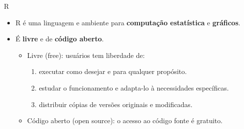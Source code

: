 \documentclass[
  ignorenonframetext,
  serif,
  professionalfont,
  usenames,
  dvipsnames,
  aspectratio = 169]{beamer}
\providecommand{\tightlist}{%
  \setlength{\itemsep}{0pt}\setlength{\parskip}{0pt}}
\renewcommand{\tightlist}{%
  \setlength{\itemsep}{0\baselineskip}
  \setlength{\parskip}{0.25\baselineskip}
}
\begin{document}
\begin{frame}{R}
\label{r}
\begin{itemize}
\tightlist
\item
  R é uma linguagem e ambiente para \textbf{computação estatística} e
  \textbf{gráficos}.
\end{itemize}

\vspace{0.3cm}

\begin{itemize}
\tightlist
\item
  É \textbf{livre} e de \textbf{código aberto}.

  \begin{itemize}
  \tightlist
  \item
    Livre (free): usuários tem liberdade de:

    \begin{enumerate}
    \tightlist
    \item
      executar como desejar e para qualquer propósito.
    \item
      estudar o funcionamento e adapta-lo à necessidades específicas.
    \item
      distribuir cópias de versões originais e modificadas.
    \end{enumerate}
  \item
    Código aberto (open source): o acesso ao código fonte é gratuito.
  \end{itemize}
\end{itemize}
\end{frame}
\end{document}
